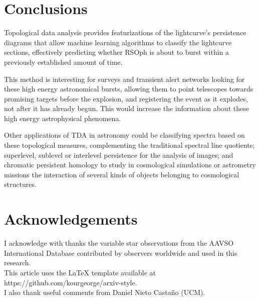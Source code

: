 \documentclass{article}
\begin{document}

\section{Conclusions}
 Topological data analysis provides featurizations of the lightcurve's persistence diagrams that allow machine learning algorithms to classify the lightcurve sections, effectively predicting whether RSOph is about to burst within a previously established amount of time. 

This method is interesting for surveys and transient alert networks looking for these high energy astronomical bursts, allowing them to point telescopes towards promising targets before the explosion, and registering the event as it explodes, not after it has already begun. This would increase the information about these high energy astrophysical phenomena.

Other applications of TDA in astronomy could be classifying spectra based on these topological measures, complementing the traditional spectral line quotients; superlevel, sublevel or interlevel persistence for the analysis of images; and chromatic persistent homology to study in cosmological simulations or astrometry missions the interaction of several kinds of objects belonging to cosmological structures.
\\
\section{Acknowledgements}
      I acknowledge with thanks the variable star observations from the AAVSO International Database contributed by observers worldwide and used in this research.\\
      This article uses the LaTeX template available at https://github.com/kourgeorge/arxiv-style.\\
      I also thank useful comments from Daniel Nieto Castaño (UCM).
\end{document}
